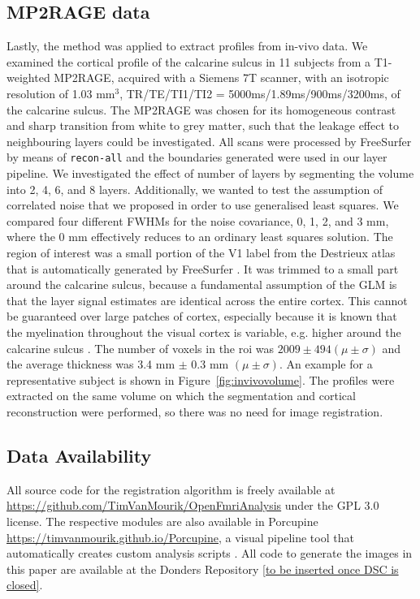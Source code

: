 \subsection{MP2RAGE data}
Lastly, the method was applied to extract profiles from in-vivo data. We examined the cortical profile of the calcarine sulcus in 11 subjects from a T1-weighted MP2RAGE, acquired with a Siemens 7T scanner, with an isotropic resolution of 1.03 mm$^3$, TR/TE/TI1/TI2 = 5000ms/1.89ms/900ms/3200ms, of the calcarine sulcus. The MP2RAGE was chosen for its homogeneous contrast and sharp transition from white to grey matter, such that the leakage effect to neighbouring layers could be investigated. All scans were processed by FreeSurfer \cite{Dale1999} by means of \texttt{recon-all} and the boundaries generated were used in our layer pipeline. We investigated the effect of number of layers by segmenting the volume into 2, 4, 6, and 8 layers. Additionally, we wanted to test the assumption of correlated noise that we proposed in order to use generalised least squares. We compared four different FWHMs for the noise covariance, 0, 1, 2, and 3 mm, where the 0 mm effectively reduces to an ordinary least squares solution. The region of interest was a small portion of the V1 label from the Destrieux atlas that is automatically generated by FreeSurfer \cite{Fischl2004}. It was trimmed to a small part around the calcarine sulcus, because a fundamental assumption of the GLM is that the layer signal estimates are identical across the entire cortex. This cannot be guaranteed over large patches of cortex, especially because it is known that the myelination throughout the visual cortex is variable, e.g. higher around the calcarine sulcus \cite{Bridge2005}. The number of voxels in the roi was $2009 \pm 494 (\mu \pm \sigma)$ and the average thickness was 3.4 mm $\pm$ 0.3 mm $(\mu \pm \sigma)$. An example for a representative subject is shown in Figure~\ref{fig:invivovolume}. The profiles were extracted on the same volume on which the segmentation and cortical reconstruction were performed, so there was no need for image registration.


\subsection*{Data Availability}
All source code for the registration algorithm is freely available at \url{https://github.com/TimVanMourik/OpenFmriAnalysis} under the GPL 3.0 license. The respective modules are also available in Porcupine \url{https://timvanmourik.github.io/Porcupine}, a visual pipeline tool that automatically creates custom analysis scripts \cite{VanMourik2017}. All code to generate the images in this paper are available at the Donders Repository \url{[to be inserted once DSC is closed]}.

